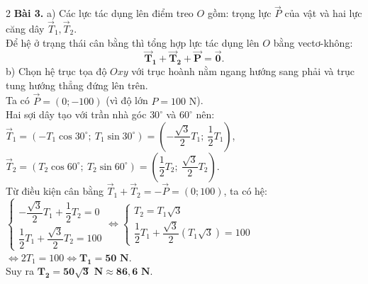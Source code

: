 \documentclass[10pt,a4paper]{article}
\begin{document}
\begin{multicols}{2}
\textbf{Bài 3.}
a) Các lực tác dụng lên điểm treo $O$ gồm: trọng lực $\vec{P}$ của vật và hai lực căng dây $\vec{T}_1, \vec{T}_2$.\\
Để hệ ở trạng thái cân bằng thì tổng hợp lực tác dụng lên $O$ bằng vectơ-không:\\
$$\mathbf{\vec{T}_1 + \vec{T}_2 + \vec{P} = \vec{0}}.$$
b) Chọn hệ trục tọa độ $Oxy$ với trục hoành nằm ngang hướng sang phải và trục tung hướng thẳng đứng lên trên.\\
Ta có $\vec{P} = (0; -100)$ (vì độ lớn $P = 100\text{ N}$).\\
Hai sợi dây tạo với trần nhà góc $30^\circ$ và $60^\circ$ nên:\\
$\vec{T}_1 = (-T_1 \cos 30^\circ;\ T_1 \sin 30^\circ) = \left(-\dfrac{\sqrt{3}}{2}T_1;\ \dfrac{1}{2}T_1\right)$,\\
$\vec{T}_2 = (T_2 \cos 60^\circ;\ T_2 \sin 60^\circ) = \left(\dfrac{1}{2}T_2;\ \dfrac{\sqrt{3}}{2}T_2\right)$.\\
Từ điều kiện cân bằng $\vec{T}_1 + \vec{T}_2 = -\vec{P} = (0; 100)$, ta có hệ:\\
$\begin{cases} -\dfrac{\sqrt{3}}{2}T_1 + \dfrac{1}{2}T_2 = 0 \\[4pt] \dfrac{1}{2}T_1 + \dfrac{\sqrt{3}}{2}T_2 = 100 \end{cases} \Leftrightarrow \begin{cases} T_2 = T_1\sqrt{3} \\[4pt] \dfrac{1}{2}T_1 + \dfrac{\sqrt{3}}{2}(T_1\sqrt{3}) = 100 \end{cases}$\\
$\Leftrightarrow 2T_1 = 100 \Leftrightarrow \mathbf{T_1 = 50\text{ N}}$.\\
Suy ra $\mathbf{T_2 = 50\sqrt{3}\text{ N}} \approx \mathbf{86{,}6\text{ N}}$.

\end{multicols}
\end{document}
